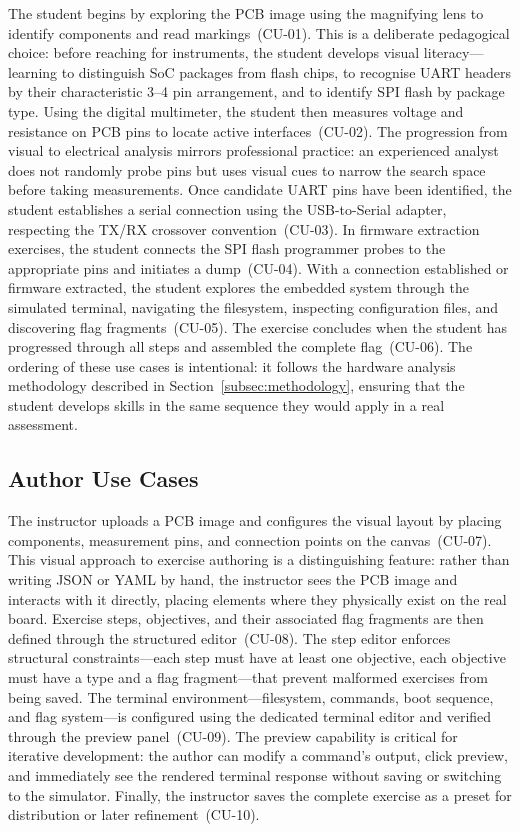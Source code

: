 The student begins by exploring the PCB image using the magnifying lens to identify components and read markings~(CU-01). This is a deliberate pedagogical choice: before reaching for instruments, the student develops visual literacy---learning to distinguish SoC packages from flash chips, to recognise UART headers by their characteristic 3--4 pin arrangement, and to identify SPI flash by package type. Using the digital multimeter, the student then measures voltage and resistance on PCB pins to locate active interfaces~(CU-02). The progression from visual to electrical analysis mirrors professional practice: an experienced analyst does not randomly probe pins but uses visual cues to narrow the search space before taking measurements. Once candidate UART pins have been identified, the student establishes a serial connection using the USB-to-Serial adapter, respecting the TX/RX crossover convention~(CU-03). In firmware extraction exercises, the student connects the SPI flash programmer probes to the appropriate pins and initiates a dump~(CU-04). With a connection established or firmware extracted, the student explores the embedded system through the simulated terminal, navigating the filesystem, inspecting configuration files, and discovering flag fragments~(CU-05). The exercise concludes when the student has progressed through all steps and assembled the complete flag~(CU-06). The ordering of these use cases is intentional: it follows the hardware analysis methodology described in Section~\ref{subsec:methodology}, ensuring that the student develops skills in the same sequence they would apply in a real assessment.

\subsection{Author Use Cases}\label{subsec:uc-author}

The instructor uploads a PCB image and configures the visual layout by placing components, measurement pins, and connection points on the canvas~(CU-07). This visual approach to exercise authoring is a distinguishing feature: rather than writing JSON or YAML by hand, the instructor sees the PCB image and interacts with it directly, placing elements where they physically exist on the real board. Exercise steps, objectives, and their associated flag fragments are then defined through the structured editor~(CU-08). The step editor enforces structural constraints---each step must have at least one objective, each objective must have a type and a flag fragment---that prevent malformed exercises from being saved. The terminal environment---filesystem, commands, boot sequence, and flag system---is configured using the dedicated terminal editor and verified through the preview panel~(CU-09). The preview capability is critical for iterative development: the author can modify a command's output, click preview, and immediately see the rendered terminal response without saving or switching to the simulator. Finally, the instructor saves the complete exercise as a preset for distribution or later refinement~(CU-10).
